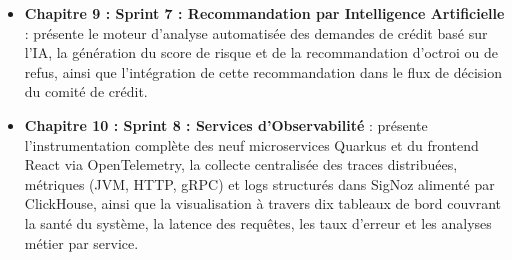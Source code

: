 \begin{itemize}
    \item[\ding{226}] \textbf{Chapitre 9 : Sprint 7 : Recommandation par Intelligence
    Artificielle} : présente le moteur d'analyse automatisée des demandes de crédit basé
    sur l'IA, la génération du score de risque et de la recommandation d'octroi ou de refus,
    ainsi que l'intégration de cette recommandation dans le flux de décision du comité de
    crédit.

    \item[\ding{226}] \textbf{Chapitre 10 : Sprint 8 : Services d'Observabilité} : présente
    l'instrumentation complète des neuf microservices Quarkus et du frontend React via
    OpenTelemetry, la collecte centralisée des traces distribuées, métriques (JVM, HTTP,
    gRPC) et logs structurés dans SigNoz alimenté par ClickHouse, ainsi que la visualisation
    à travers dix tableaux de bord couvrant la santé du système, la latence des requêtes,
    les taux d'erreur et les analyses métier par service.

\end{itemize}
